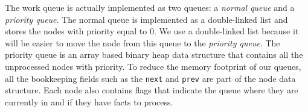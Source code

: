 The work queue is actually implemented as two queues: a \emph{normal queue} and a \emph{priority queue}.
The normal queue is implemented as a double-linked list and stores the nodes with priority equal to 0.
We use a double-linked list because it will be easier to move the node from this queue to the
\emph{priority queue}. The priority queue is an array based binary heap data structure that contains
all the unprocessed nodes with priority. To reduce the memory footprint of our queues, all the bookkeeping fields
such as the \texttt{next} and \texttt{prev} are part of the node data structure.
Each node also contains flags that indicate the queue where they are currently in and if they have facts to process.

\normalsize

\begin{comment}
\section{Nodes}

\begin{figure}[h!]
     \centering
   \resizebox{10cm}{!}{

    \texttt{[image: node.pdf]}}
    \caption{The node data structure.}
    \label{fig:node}
\end{figure}

The node data structure with an empty database occupies around 150 bytes.
In Fig.~\ref{fig:node} we present the node data structure and its fields. We summarize the data below:

\begin{description}
   \item[queue data]: Includes the field \texttt{Prev} (for the normal queue), \texttt{Next} (for the normal queue), \texttt{Prio} (priority) and \texttt{Queue Pos} (for the priority queue).
   \item[flags]: If the node is currently in the queue and in which queue. Includes \texttt{In Queue}, \texttt{In Normal Queue} and \texttt{In Priority Queue}.
   \item[temporary store]: A simple linked-list containing the unprocessed facts called \texttt{Temporary Store}.
   \item[database]: All the facts already processed which are true for this node. Is implemented as a trie and it is called \texttt{Tries}.
   \item[rule matcher]: The \texttt{Matcher} maintains the number of facts per predicate and which rules can be activated next. This is used for selecting the candidate rules.
   \item[owner]: Pointer to the owner thread. \texttt{Owner} in the figure.
   \item[lock]: A \texttt{Lock} mutex used to manipulate the node.
\end{description}
\end{comment}

